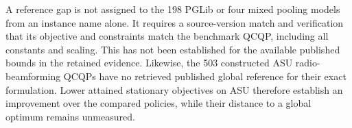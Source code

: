 \documentclass[pdflatex,sn-mathphys-num]{sn-jnl}
\theoremstyle{thmstyleone}
\theoremstyle{thmstylethree}
\newenvironment{scaledtable}[1][tbp]{\begin{tableorg}[#1]\centering}{\end{tableorg}}
\begin{document}
\begin{scaledtable}[t]
\centering\small
\caption{Facility reference sensitivity to the library's reported primal
infeasibility. The final column normalizes the change by
$\max\{1,|f_{\rm ref}|\}$.}
\label{tab:reference-facility-precision}
\end{scaledtable}

A reference gap is not assigned to the 198 PGLib or four mixed pooling
models from an instance name alone. It requires a source-version match
and verification that its objective and constraints match the benchmark
QCQP, including all constants and scaling. This has not been established for
the available published bounds in the retained evidence. Likewise, the
503 constructed ASU radio-beamforming QCQPs have no retrieved published
global reference for their exact formulation. Lower attained stationary
objectives on ASU therefore establish an improvement over the compared
policies, while their distance to a global optimum remains unmeasured.
\end{document}
